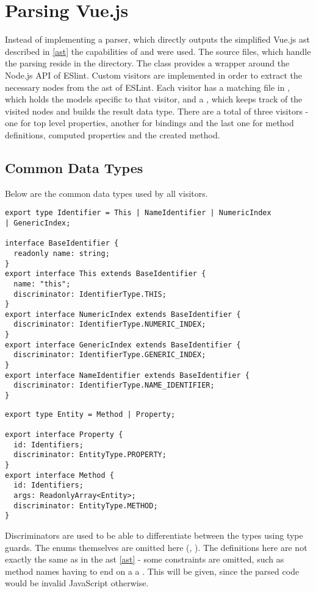 \section{Parsing Vue.js}

Instead of implementing a parser, which directly outputs the simplified Vue.js \gls{ast} described in \ref{ast} the capabilities of \textcite{eslintMainPage} 
and \parencite{eslint_vue_parser} were used. 
The source files, which handle the parsing reside in the  directory.
The  class provides a wrapper around the Node.js API of ESlint. Custom visitors are implemented in order to extract the necessary nodes from the \gls{ast} of ESLint. Each visitor has a matching file in , which holds the models specific to that visitor, and a , which keeps track of the visited nodes and builds the result data type. There are a total of three visitors - one for top level properties, another for bindings and the last one for method definitions, computed properties and the created method.
 
\subsection{Common Data Types}
Below are the common data types used by all visitors.
\begin{lstlisting}
export type Identifier = This | NameIdentifier | NumericIndex 
| GenericIndex;

interface BaseIdentifier {
  readonly name: string;
}
export interface This extends BaseIdentifier {
  name: "this";
  discriminator: IdentifierType.THIS;
}
export interface NumericIndex extends BaseIdentifier {
  discriminator: IdentifierType.NUMERIC_INDEX;
}
export interface GenericIndex extends BaseIdentifier {
  discriminator: IdentifierType.GENERIC_INDEX;
}
export interface NameIdentifier extends BaseIdentifier {
  discriminator: IdentifierType.NAME_IDENTIFIER;
}
\end{lstlisting}

\begin{lstlisting} 
export type Entity = Method | Property;

export interface Property {
  id: Identifiers;
  discriminator: EntityType.PROPERTY;
}
export interface Method {
  id: Identifiers;
  args: ReadonlyArray<Entity>;
  discriminator: EntityType.METHOD;
}
\end{lstlisting}
Discriminators are used to be able to differentiate between the types using type guards. The enums themselves are omitted here (, ). The definitions here are not exactly the same as in the \gls{ast} \ref{ast} - some constraints are omitted, such as method names having to end on a a . This will be given, since the parsed code would be invalid JavaScript otherwise.
